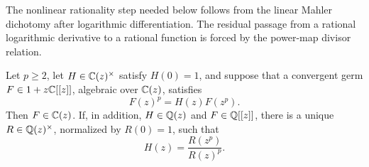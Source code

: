 The nonlinear rationality step needed below follows from the linear Mahler
dichotomy after logarithmic differentiation.  The residual passage from a
rational logarithmic derivative to a rational function is forced by the
power-map divisor relation.

\begin{proposition}
\label{prop:algebraic-mahler-coboundary}
Let \(p\ge2\), let \(H\in\mathbb{C}(z)^\times\) satisfy \(H(0)=1\), and suppose
that a convergent germ \(F\in1+z\mathbb{C}[[z]]\), algebraic over \(\mathbb{C}(z)\),
satisfies
\begin{equation}\label{eq:algebraic-critical-mahler-equation}
 F(z)^p=H(z)F(z^p).
\end{equation}
Then \(F\in\mathbb{C}(z)\).  If, in addition, \(H\in\mathbb{Q}(z)\) and
\(F\in\mathbb{Q}[[z]]\), there is a unique \(R\in\mathbb{Q}(z)^\times\), normalized by
\(R(0)=1\), such that
\begin{equation}\label{eq:general-rational-mahler-coboundary}
 H(z)=\frac{R(z^p)}{R(z)^p}.
\end{equation}
\end{proposition}

